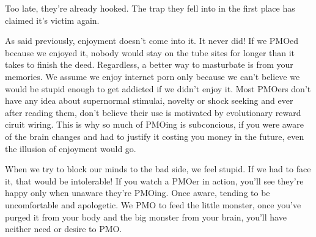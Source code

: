 \documentclass[easypeasy.tex]{subfiles}
\begin{document}
Too late, they're already hooked. The trap they fell into in the first place has claimed it's victim again.

As said previously, enjoyment doesn't come into it. It never did! If we PMOed because we enjoyed it, nobody would stay on the tube sites for longer than it takes to finish the deed. Regardless, a better way to masturbate is from your memories. We assume we enjoy internet porn only because we can't believe we would be stupid enough to get addicted if we didn't enjoy it. Most PMOers don't have any idea about supernormal stimulai, novelty or shock seeking and ever after reading them, don't believe their use is motivated by evolutionary reward ciruit wiring. This is why so much of PMOing is subconcious, if you were aware of the brain changes and had to justify it costing you money in the future, even the illusion of enjoyment would go.

When we try to block our minds to the bad side, we feel stupid. If we had to face it, that would be intolerable! If you watch a PMOer in action, you'll see they're happy only when unaware they're PMOing. Once aware, tending to be uncomfortable and apologetic. We PMO to feed the little monster, once you've purged it from your body and the big monster from your brain, you'll have neither need or desire to PMO.
\end{document}
